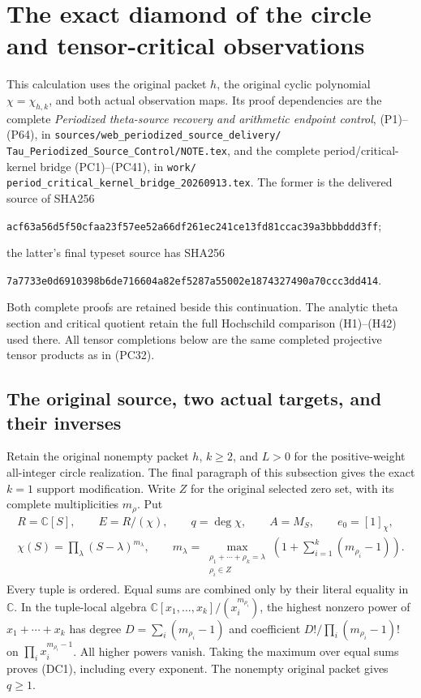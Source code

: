 \section{The exact diamond of the circle and tensor-critical observations}
\label{sec:circle-critical-diamond}

This calculation uses the original packet $h$, the original cyclic
polynomial $\chi=\chi_{h,k}$, and both actual observation maps.  Its
proof dependencies are the complete \emph{Periodized theta-source
recovery and arithmetic endpoint control}, (P1)--(P64), in
\texttt{sources/web\_periodized\_source\_delivery/}
\texttt{Tau\_Periodized\_Source\_Control/NOTE.tex}, and the complete
period/critical-kernel bridge (PC1)--(PC41), in
\texttt{work/}\allowbreak
\texttt{period\_critical\_kernel\_bridge\_20260913.tex}.
The former is the delivered source of SHA256
\par\noindent
\texttt{acf63a56d5f50cfaa23f57ee52a66df261ec241ce13fd81ccac39a3bbbddd3ff};
\par\noindent
the latter's final typeset source has SHA256
\par\noindent
\texttt{7a7733e0d6910398b6de716604a82ef5287a55002e1874327490a70ccc3dd414}.
\par\noindent
Both complete proofs are retained beside this continuation.  The
analytic theta section and critical quotient retain the full
Hochschild comparison (H1)--(H42) used there.  All tensor completions
below are the same completed projective tensor products as in (PC32).

\subsection{The original source, two actual targets, and their inverses}

Retain the original nonempty packet $h$, $k\ge2$, and $L>0$
for the positive-weight all-integer circle
realization.  The final paragraph of this subsection gives the exact
$k=1$ support modification.  Write $Z$ for the original selected zero
set, with its complete multiplicities $m_\rho$.  Put
\[
 \begin{gathered}
 R=\mathbb C[S],\qquad E=R/(\chi),\qquad q=\deg\chi,\qquad
 A=M_S,\qquad e_0=[1]_\chi,\\
 \chi(S)=\prod_{\lambda}(S-\lambda)^{m_\lambda},\qquad
 m_\lambda=\max_{\substack{\rho_1+\cdots+\rho_k=\lambda\\\rho_i\in Z}}
       \left(1+\sum_{i=1}^k(m_{\rho_i}-1)\right).
 \end{gathered}
 \tag{DC1}
\]
Every tuple is ordered.  Equal sums are combined only by their literal
equality in $\mathbb C$.  In the tuple-local algebra
$\mathbb C[x_1,\ldots,x_k]/(x_i^{m_{\rho_i}})$, the highest nonzero
power of $x_1+\cdots+x_k$ has degree
$D=\sum_i(m_{\rho_i}-1)$ and coefficient
$D!/\prod_i(m_{\rho_i}-1)!$ on
$\prod_i x_i^{m_{\rho_i}-1}$.  All higher powers vanish.  Taking the
maximum over equal sums proves (DC1), including every exponent.
The nonempty original packet gives $q\ge1$.

